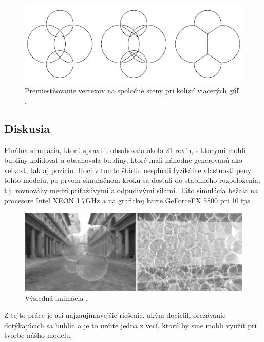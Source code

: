 \begin{figure}[H]
	\begin{center}
		\includegraphics[width=\textwidth]{images/sunkel/verticies_displacement_2}
		\caption{Premiestňovanie vertexov na spoločné steny pri kolízií viacerých gúľ \cite{sunkel2004}.}
		\label{img:verticies_displacement_2}
	\end{center}
\end{figure}

\subsection{Diskusia}

Finálna simulácia, ktorú spravili, obsahovala okolo 21 rovín, s ktorými mohli bubliny kolidovať a obsahovala bubliny, ktoré mali náhodne generovanú ako veľkosť, tak aj pozíciu. Hoci v tomto štádiu nespĺňali fyzikálne vlastnosti peny tohto modelu, po prvom simulačnom kroku sa dostali do stabilného rozpoloženia, t.j. rovnováhy medzi príťažlivými a odpudivými silami. Táto simulácia bežala na procesore Intel XEON 1.7GHz a na grafickej karte GeForceFX 5800 pri 10 fps.
\begin{figure}[H]
	\begin{center}
		\includegraphics[width=\textwidth]{images/sunkel/results}
		\caption{Výsledná animácia \cite{sunkel2004}.}
	\end{center}
\end{figure}

Z tejto práce je asi najzaujímavejšie riešenie, akým docielili orezávanie dotýkajúcich sa bublín a je to určite jedna z vecí, ktorú by sme mohli využiť pri tvorbe nášho modelu.

